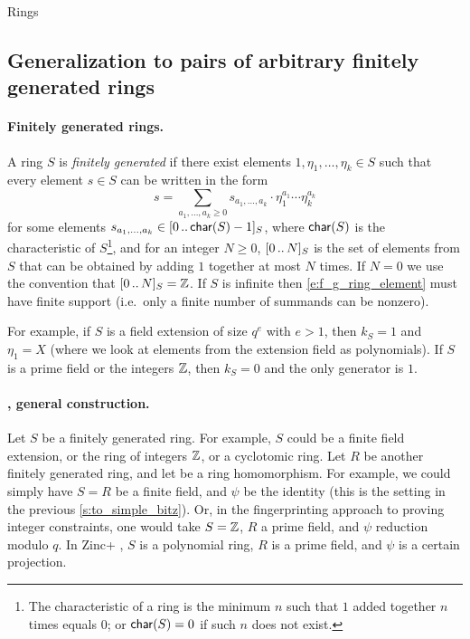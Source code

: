 \begin{lncsmove}{Rings}
\subsection{Generalization to pairs of arbitrary finitely generated rings}\label{s:to_general_rings}






\paragraph{Finitely generated rings.} A ring $S$ is \emph{finitely generated} if  there exist elements $1, \eta_1, \ldots, \eta_k\in S$ such that every element $s\in S$ can be written in the form \begin{equation}\label{e:f_g_ring_element}s =  \sum_{a_1,\ldots, a_k\geq 0} s_{a_1,\ldots, a_k} \cdot \eta_1^{a_1}\cdots \eta_k^{a_k}\end{equation}  for some elements $s_{a_1,\ldots, a_k} \in [0 \, .. \, \mathsf{char}(S)-1]_S$, where $\mathsf{char}(S)$ is the characteristic of $S$\footnote{The characteristic of a ring  is the minimum $n$ such that $1$ added together $n$ times equals $0$; or $\mathsf{char}(S)=0$ if such $n$ does not exist.}, and for an integer $N\geq 0$, $[0 \, .. \, N]_S$  is the set of elements from $S$ that can be obtained by adding $1$ together at most $N$ times.  If $N=0$ we use the convention that $[0 \, .. \, N]_S=\mathbb{Z}$. If $S$ is infinite then \eqref{e:f_g_ring_element} must have finite support (i.e.\ only a finite number of summands can be nonzero).


For example, if $S$ is a field extension of size $q^e$ with $e> 1$, then $k_S=1$ and $\eta_1 = X$ (where we look at elements from the extension field as polynomials). If $S$ is a prime field or the integers $\mathbb{Z}$, then $k_S=0$ and the only generator is $1$. 

\paragraph{\ftwoz, general construction.} Let $S$ be a finitely generated ring. For example, $S$ could be a finite field extension, or the ring of integers $\mathbb{Z}$, or a cyclotomic ring. Let $R$ be another finitely generated ring, and let  be a ring homomorphism. For example, we could simply have $S=R$ be a finite field, and $\psi$ be the identity (this is the setting in the previous \cref{s:to_simple_bitz}).  Or, in the fingerprinting approach to proving integer constraints, one would take $S=\mathbb{Z}$, $R$ a prime field, and $\psi$ reduction modulo $q$. In Zinc+ \cite{zincplus}, $S$ is a polynomial ring, $R$ is a prime field, and $\psi$ is a certain projection. 


\end{lncsmove}
